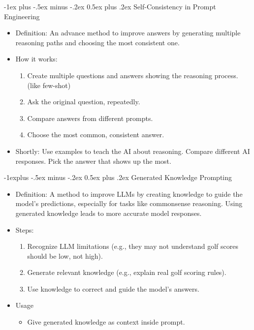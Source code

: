 \documentclass[10pt,landscape]{article}
\makeatletter
\renewcommand{\section}{\@startsection{section}{1}{0mm}%
                                {-1ex plus -.5ex minus -.2ex}%
                                {0.5ex plus .2ex}%
                                {\normalfont\large\bfseries}}
\renewcommand{\subsection}{\@startsection{subsection}{2}{0mm}%
                                {-1explus -.5ex minus -.2ex}%
                                {0.5ex plus .2ex}%
                                {\normalfont\normalsize\bfseries}}
\makeatother
\begin{document}
\begin{multicols}{3}
\section{Self-Consistency in Prompt Engineering}
\begin{itemize}
    \item Definition: An advance method to improve answers by generating multiple reasoning paths and choosing the most consistent one.
    \item How it works:
    \begin{enumerate}
        \item Create multiple questions and answers showing the reasoning process. (like few-shot)
        \item Ask the original question, repeatedly.
        \item Compare answers from different prompts.
        \item Choose the most common, consistent answer.
    \end{enumerate}
    \item Shortly: Use examples to teach the AI about reasoning. Compare different AI responses. Pick the answer that shows up the most.
\end{itemize}

\subsection{Generated Knowledge Prompting}
\begin{itemize}
    \item Definition: A method to improve LLMs by creating knowledge to guide the model's predictions, especially for tasks like commonsense reasoning. Using generated knowledge leads to more accurate model responses.
    \item Steps:
    \begin{enumerate}
        \item Recognize LLM limitations (e.g., they may not understand golf scores should be low, not high).
        \item Generate relevant knowledge (e.g., explain real golf scoring rules).
        \item Use knowledge to correct and guide the model's answers.
    \end{enumerate}
    \item Usage
    \begin{itemize}
        \item Give generated knowledge as context inside prompt.
    \end{itemize}
\end{itemize}


\end{multicols}
\end{document}
